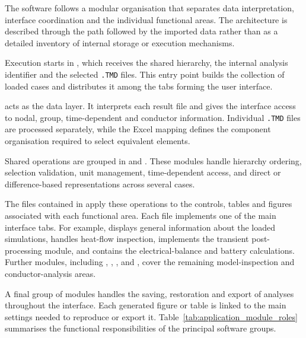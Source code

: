 The software follows a modular organisation that separates data
interpretation, interface coordination and the individual functional areas.
The architecture is described through the path followed by the imported data
rather than as a detailed inventory of internal storage or execution
mechanisms.

Execution starts in
, which receives the shared
hierarchy, the internal analysis identifier and the selected
\texttt{.TMD} files. This entry point builds the collection of loaded cases
and distributes it among the tabs forming the user interface.

 acts as the data layer. It interprets each result
file and gives the interface access to nodal, group, time-dependent and
conductor information. Individual \texttt{.TMD} files are processed
separately, while the Excel mapping defines the component organisation required
to select equivalent elements.

Shared operations are grouped in  and
. These modules handle hierarchy ordering, selection
validation, unit management, time-dependent access, and direct or
difference-based representations across several cases.

The files contained in  apply these operations to the controls,
tables and figures associated with each functional area. Each file implements
one of the main interface tabs. For example,
 displays general information about the loaded simulations,
 handles heat-flow inspection,
 implements the transient post-processing module, and
 contains the electrical-balance and battery calculations.
Further modules, including ,
, ,
 and , cover the remaining
model-inspection and conductor-analysis areas.


A final group of modules handles the saving, restoration and export of
analyses throughout the interface. Each generated figure or table is linked
to the main settings needed to reproduce or export it.
Table~\ref{tab:application_module_roles} summarises the functional
responsibilities of the principal software groups.


\ApplicationModuleTable[0.97\textwidth]

